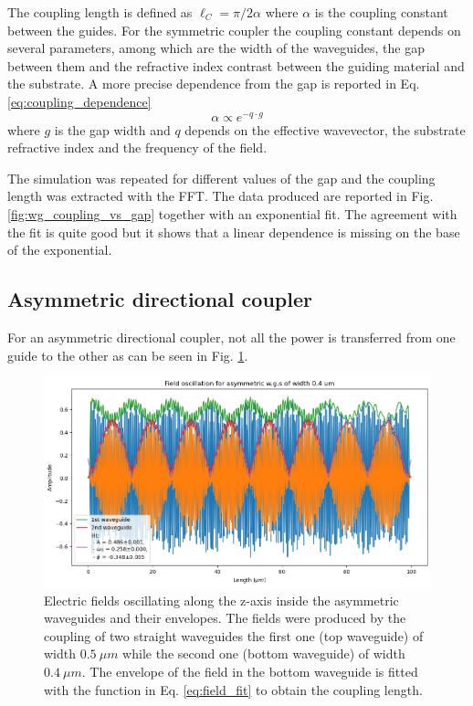 The coupling length is defined as $\ell_C = \pi / 2\alpha$ where $\alpha$ is the coupling constant between the guides. For the symmetric coupler the coupling constant depends on several parameters\cite{photonics_book}, among which are the width of the waveguides, the gap between them and the refractive index contrast between the guiding material and the substrate. A more precise dependence from the gap is reported in Eq. \ref{eq:coupling_dependence}
\begin{equation} \label{eq:coupling_dependence}
    \alpha \propto e^{-q\cdot g} 
\end{equation}
where \(g\) is the gap width and \(q\) depends on the effective wavevector, the substrate refractive index and the frequency of the field\cite{photonics_book}.

The simulation was repeated for different values of the gap and the coupling length was extracted with the FFT. The data produced are reported in Fig. \ref{fig:wg_coupling_vs_gap} together with an exponential fit. The agreement with the fit is quite good but it shows that a linear dependence is missing on the base of the exponential.
        
\subsection{Asymmetric directional coupler}

For an asymmetric directional coupler, not all the power is transferred from one guide to the other as can be seen in Fig. \ref{fig:wg_field_asymm}.

\begin{figure}[H]
    \centering
    \includegraphics[width=0.8\linewidth]{Figures/wg_field_asymm.png}
    \caption{Electric ﬁelds oscillating along the z-axis inside the asymmetric waveguides and their envelopes. The fields were produced by the coupling of two straight waveguides the first one (top waveguide) of width \(0.5\ \mu m\) while the second one (bottom waveguide) of width \(0.4\ \mu m\). The envelope of the field in the bottom waveguide is ﬁtted with the function in Eq. \ref{eq:field_fit} to obtain the coupling length.}
    \label{fig:wg_field_asymm}
\end{figure}

